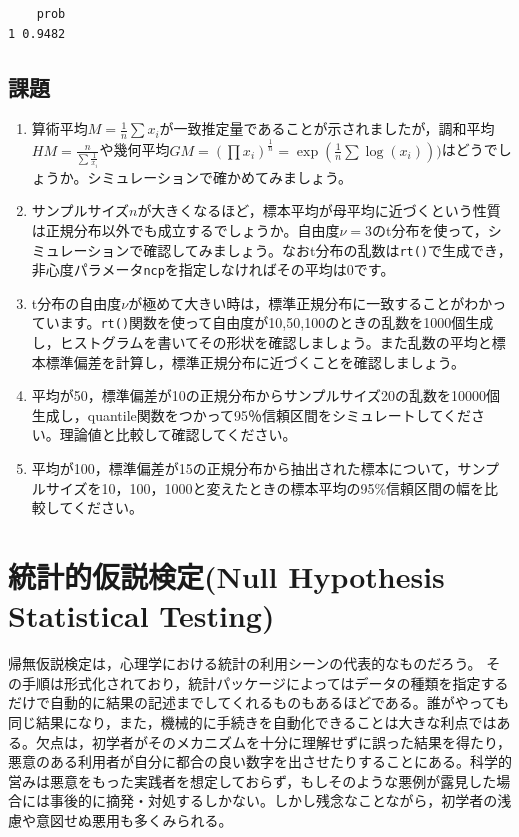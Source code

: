 \documentclass[
  a4paper,
]{ltjsbook}
\providecommand{\tightlist}{%
  \setlength{\itemsep}{0pt}\setlength{\parskip}{0pt}}
\begin{document}
\begin{verbatim}
    prob
1 0.9482
\end{verbatim}

\section{課題}\label{ux8ab2ux984c-4}

\begin{enumerate}
\def\labelenumi{\arabic{enumi}.}
\tightlist
\item
  算術平均\(M = \frac{1}{n}\sum x_i\)が一致推定量であることが示されましたが，調和平均\(HM = \frac{n}{\sum \frac{1}{x_i}}\)や幾何平均\(GM = (\prod x_i)^{\frac{1}{n}} = \exp(\frac{1}{n}\sum \log(x_i)))\)はどうでしょうか。シミュレーションで確かめてみましょう。
\item
  サンプルサイズ\(n\)が大きくなるほど，標本平均が母平均に近づくという性質は正規分布以外でも成立するでしょうか。自由度\(\nu = 3\)のt分布を使って，シミュレーションで確認してみましょう。なおt分布の乱数は\texttt{rt()}で生成でき，非心度パラメータ\texttt{ncp}を指定しなければその平均は0です。
\item
  t分布の自由度\(\nu\)が極めて大きい時は，標準正規分布に一致することがわかっています。\texttt{rt()}関数を使って自由度が10,50,100のときの乱数を1000個生成し，ヒストグラムを書いてその形状を確認しましょう。また乱数の平均と標本標準偏差を計算し，標準正規分布に近づくことを確認しましょう。
\item
  平均が50，標準偏差が10の正規分布からサンプルサイズ20の乱数を10000個生成し，quantile関数をつかって95％信頼区間をシミュレートしてください。理論値と比較して確認してください。
\item
  平均が100，標準偏差が15の正規分布から抽出された標本について，サンプルサイズを10，100，1000と変えたときの標本平均の95\%信頼区間の幅を比較してください。
\end{enumerate}


\chapter{統計的仮説検定(Null Hypothesis Statistical
Testing)}\label{ux7d71ux8a08ux7684ux4eeeux8aacux691cux5b9anull-hypothesis-statistical-testing}

帰無仮説検定は，心理学における統計の利用シーンの代表的なものだろう。
その手順は形式化されており，統計パッケージによってはデータの種類を指定するだけで自動的に結果の記述までしてくれるものもあるほどである。誰がやっても同じ結果になり，また，機械的に手続きを自動化できることは大きな利点ではある。欠点は，初学者がそのメカニズムを十分に理解せずに誤った結果を得たり，悪意のある利用者が自分に都合の良い数字を出させたりすることにある。科学的営みは悪意をもった実践者を想定しておらず，もしそのような悪例が露見した場合には事後的に摘発・対処するしかない。しかし残念なことながら，初学者の浅慮や意図せぬ悪用も多くみられる。
\end{document}

